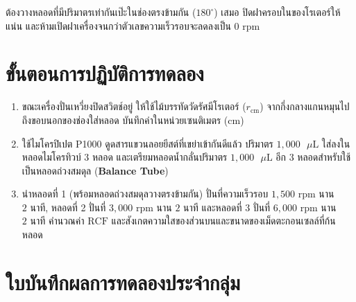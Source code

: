 \begin{warningbox}
ต้องวางหลอดที่มีปริมาตรเท่ากันเป๊ะในช่องตรงข้ามกัน ($180^\circ$) เสมอ ปิดฝาครอบในของโรเตอร์ให้แน่น และห้ามเปิดฝาเครื่องจนกว่าตัวเลขความเร็วรอบจะลดลงเป็น $0\text{ rpm}$
\end{warningbox}

\section{ขั้นตอนการปฏิบัติการทดลอง}
\begin{enumerate}
    \item ขณะเครื่องปั่นเหวี่ยงปิดสวิตช์อยู่ ให้ใช้ไม้บรรทัดวัดรัศมีโรเตอร์ ($r_{\text{cm}}$) จากกึ่งกลางแกนหมุนไปถึงขอบนอกของช่องใส่หลอด บันทึกค่าในหน่วยเซนติเมตร ($\text{cm}$)
    \item ใช้ไมโครปิเปต P1000 ดูดสารแขวนลอยยีสต์ที่เขย่าเข้ากันดีแล้ว ปริมาตร $1{,}000\text{ }\mu\text{L}$ ใส่ลงในหลอดไมโครทิวบ์ 3 หลอด และเตรียมหลอดน้ำกลั่นปริมาตร $1{,}000\text{ }\mu\text{L}$ อีก 3 หลอดสำหรับใช้เป็นหลอดถ่วงสมดุล (\textbf{Balance Tube})
    \item นำหลอดที่ 1 (พร้อมหลอดถ่วงสมดุลวางตรงข้ามกัน) ปั่นที่ความเร็วรอบ $1{,}500\text{ rpm}$ นาน $2\text{ นาที}$, หลอดที่ 2 ปั่นที่ $3{,}000\text{ rpm}$ นาน $2\text{ นาที}$ และหลอดที่ 3 ปั่นที่ $6{,}000\text{ rpm}$ นาน $2\text{ นาที}$ คำนวณค่า $\text{RCF}$ และสังเกตความใสของส่วนบนและขนาดของเม็ดตะกอนเซลล์ที่ก้นหลอด
\end{enumerate}

\section{ใบบันทึกผลการทดลองประจำกลุ่ม}

